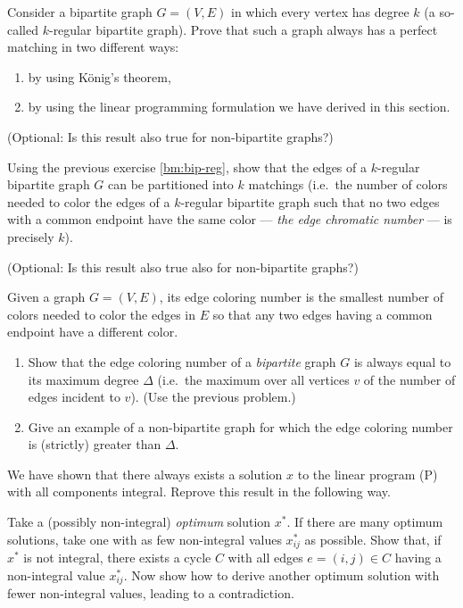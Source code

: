 \documentclass[12pt]{article}
\begin{document}
\begin{exercises}
\item \label{bm:bip-reg}
Consider a bipartite graph $G=(V,E)$ in which every vertex has degree
$k$ (a so-called $k$-regular bipartite graph). Prove that such a graph
always has a perfect matching in two different ways:
\begin{enumerate}
\item
by using K\"onig's theorem,
\item
by using the linear programming formulation we have derived in this
section. 
\end{enumerate}

(Optional: Is this result also true for non-bipartite graphs?)
\item
Using the previous exercise \ref{bm:bip-reg}, show that the edges of a
$k$-regular bipartite graph $G$ can be partitioned into $k$ matchings
(i.e.~the number of colors needed to color the edges of a $k$-regular
bipartite graph such that no two edges with a common  endpoint  have
the same color --- {\it the edge chromatic number} --- is precisely $k$).


(Optional: Is this result also
true also for non-bipartite graphs?)
\item
Given a graph $G=(V,E)$, its edge coloring number is the smallest
number of colors needed to color the edges in $E$ so that any two
edges having a common endpoint have a different color. 
\begin{enumerate}
\item
Show that the edge coloring number of a {\it bipartite} graph $G$ is
always equal to its maximum degree $\Delta$ (i.e.~the maximum over all
vertices $v$ of the number of edges incident to $v$). (Use the
previous problem.) 
\item
Give an example of a non-bipartite graph for which the edge coloring
number is (strictly) greater than $\Delta$. 
\end{enumerate}


\item 
We have shown that there always exists a solution $x$ to the linear
program (P) with all components integral. Reprove this result in the
following way. 

Take a (possibly non-integral) {\it optimum} solution $x^*$. If there
are many optimum solutions, take one with as few non-integral values
$x^*_{ij}$ as possible. Show that, if $x^*$ is not integral, there
exists a cycle $C$ with all edges $e=(i,j)\in C$ having a non-integral
value $x^*_{ij}$. Now show how to derive another optimum solution with
fewer non-integral values, leading to a contradiction.\\


\end{exercises}
\end{document}
